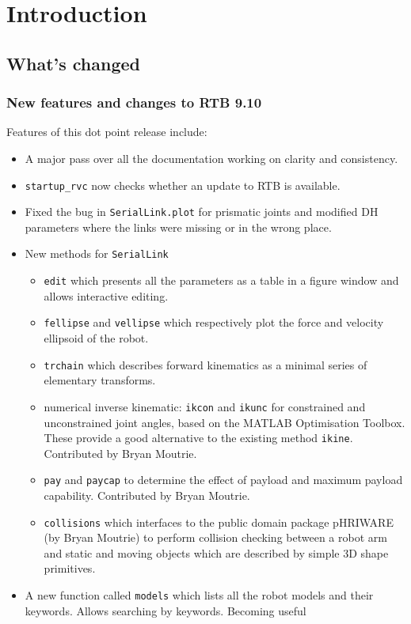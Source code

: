 \documentclass[a4paper]{report}
\begin{document}
\chapter{Introduction}
\section{What's changed}

\subsection{New features and changes to RTB 9.10}
Features of this dot point release include:
\begin{itemize}
\item A major pass over all the documentation working on clarity and consistency.
\item \texttt{startup\_rvc} now checks whether an update to RTB is available.
\item Fixed the bug in \texttt{SerialLink.plot} for prismatic joints and modified DH parameters where the links were missing or in the wrong place.
\item New methods for \texttt{SerialLink}
  \begin{itemize}
   \item \texttt{edit} which presents all the parameters as a table in a figure window and allows
interactive editing.
   \item \texttt{fellipse} and \texttt{vellipse} which respectively plot the force and velocity ellipsoid of the
robot.
\item  \texttt{trchain}  which describes forward kinematics as a minimal series of elementary transforms.
\item  numerical inverse kinematic: \texttt{ikcon} and \texttt{ikunc} for constrained and unconstrained joint angles, based on the  MATLAB Optimisation Toolbox.  These provide a good alternative to the existing method 
\texttt{ikine}.  Contributed by Bryan Moutrie.
\item  \texttt{pay} and \texttt{paycap}  to determine the effect of payload and maximum payload capability.  Contributed by Bryan Moutrie.
\item   \texttt{collisions} which interfaces to the public domain package pHRIWARE (by Bryan Moutrie) to perform collision checking between a robot arm and static and moving objects which are described by simple 3D shape primitives.
 \end{itemize}
\item A new function called \texttt{models} which lists all the robot models and their keywords.  Allows searching by keywords.  Becoming useful

\end{itemize}
\end{document}
